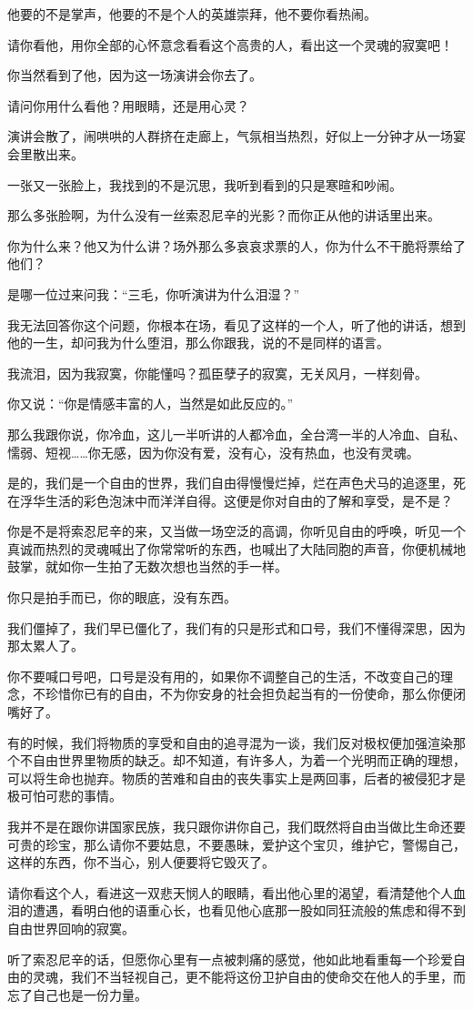 \par 他要的不是掌声，他要的不是个人的英雄崇拜，他不要你看热闹。
\par 请你看他，用你全部的心怀意念看看这个高贵的人，看出这一个灵魂的寂寞吧！
\par 你当然看到了他，因为这一场演讲会你去了。
\par 请问你用什么看他？用眼睛，还是用心灵？
\par 演讲会散了，闹哄哄的人群挤在走廊上，气氛相当热烈，好似上一分钟才从一场宴会里散出来。
\par 一张又一张脸上，我找到的不是沉思，我听到看到的只是寒暄和吵闹。
\par 那么多张脸啊，为什么没有一丝索忍尼辛的光影？而你正从他的讲话里出来。
\par 你为什么来？他又为什么讲？场外那么多哀哀求票的人，你为什么不干脆将票给了他们？
\par 是哪一位过来问我：“三毛，你听演讲为什么泪湿？”
\par 我无法回答你这个问题，你根本在场，看见了这样的一个人，听了他的讲话，想到他的一生，却问我为什么堕泪，那么你跟我，说的不是同样的语言。
\par 我流泪，因为我寂寞，你能懂吗？孤臣孽子的寂寞，无关风月，一样刻骨。
\par 你又说：“你是情感丰富的人，当然是如此反应的。”
\par 那么我跟你说，你冷血，这儿一半听讲的人都冷血，全台湾一半的人冷血、自私、懦弱、短视……你无感，因为你没有爱，没有心，没有热血，也没有灵魂。
\par 是的，我们是一个自由的世界，我们自由得慢慢烂掉，烂在声色犬马的追逐里，死在浮华生活的彩色泡沫中而洋洋自得。这便是你对自由的了解和享受，是不是？
\par 你是不是将索忍尼辛的来，又当做一场空泛的高调，你听见自由的呼唤，听见一个真诚而热烈的灵魂喊出了你常常听的东西，也喊出了大陆同胞的声音，你便机械地鼓掌，就如你一生拍了无数次想也当然的手一样。
\par 你只是拍手而已，你的眼底，没有东西。
\par 我们僵掉了，我们早已僵化了，我们有的只是形式和口号，我们不懂得深思，因为那太累人了。
\par 你不要喊口号吧，口号是没有用的，如果你不调整自己的生活，不改变自己的理念，不珍惜你已有的自由，不为你安身的社会担负起当有的一份使命，那么你便闭嘴好了。
\par 有的时候，我们将物质的享受和自由的追寻混为一谈，我们反对极权便加强渲染那个不自由世界里物质的缺乏。却不知道，有许多人，为着一个光明而正确的理想，可以将生命也抛弃。物质的苦难和自由的丧失事实上是两回事，后者的被侵犯才是极可怕可悲的事情。
\par 我并不是在跟你讲国家民族，我只跟你讲你自己，我们既然将自由当做比生命还要可贵的珍宝，那么请你不要姑息，不要愚昧，爱护这个宝贝，维护它，警惕自己，这样的东西，你不当心，别人便要将它毁灭了。
\par 请你看这个人，看进这一双悲天悯人的眼睛，看出他心里的渴望，看清楚他个人血泪的遭遇，看明白他的语重心长，也看见他心底那一股如同狂流般的焦虑和得不到自由世界回响的寂寞。
\par 听了索忍尼辛的话，但愿你心里有一点被刺痛的感觉，他如此地看重每一个珍爱自由的灵魂，我们不当轻视自己，更不能将这份卫护自由的使命交在他人的手里，而忘了自己也是一份力量。



